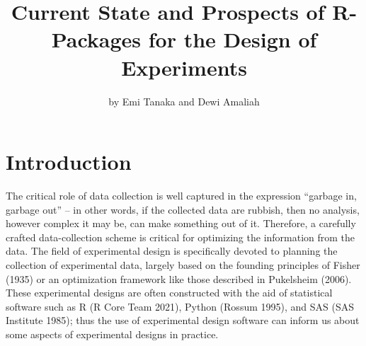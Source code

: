\title{Current State and Prospects of R-Packages for the Design of Experiments}
\author{by Emi Tanaka and Dewi Amaliah}

\maketitle


\hypertarget{introduction}{%
\section{Introduction}\label{introduction}}

The critical role of data collection is well captured in the expression ``garbage in, garbage out'' -- in other words, if the collected data are rubbish, then no analysis, however complex it may be, can make something out of it. Therefore, a carefully crafted data-collection scheme is critical for optimizing the information from the data. The field of experimental design is specifically devoted to planning the collection of experimental data, largely based on the founding principles of Fisher (1935) or an optimization framework like those described in Pukelsheim (2006). These experimental designs are often constructed with the aid of statistical software such as R (R Core Team 2021), Python (Rossum 1995), and SAS (SAS Institute 1985); thus the use of experimental design software can inform us about some aspects of experimental designs in practice.

